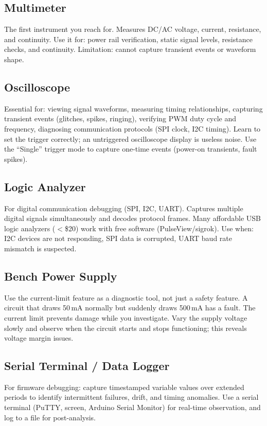 \documentclass[11pt,letterpaper,twoside,openany]{book}
\begin{document}
\subsection{Multimeter}
The first instrument you reach for. Measures DC/AC voltage, current, resistance, and continuity. Use it for: power rail verification, static signal levels, resistance checks, and continuity. Limitation: cannot capture transient events or waveform shape.

\subsection{Oscilloscope}
Essential for: viewing signal waveforms, measuring timing relationships, capturing transient events (glitches, spikes, ringing), verifying PWM duty cycle and frequency, diagnosing communication protocols (SPI clock, I2C timing). Learn to set the trigger correctly; an untriggered oscilloscope display is useless noise. Use the ``Single'' trigger mode to capture one-time events (power-on transients, fault spikes).

\subsection{Logic Analyzer}
For digital communication debugging (SPI, I2C, UART). Captures multiple digital signals simultaneously and decodes protocol frames. Many affordable USB logic analyzers ($<$\$20) work with free software (PulseView/sigrok). Use when: I2C devices are not responding, SPI data is corrupted, UART baud rate mismatch is suspected.

\subsection{Bench Power Supply}
Use the current-limit feature as a diagnostic tool, not just a safety feature. A circuit that draws 50\,mA normally but suddenly draws 500\,mA has a fault. The current limit prevents damage while you investigate. Vary the supply voltage slowly and observe when the circuit starts and stops functioning; this reveals voltage margin issues.

\subsection{Serial Terminal / Data Logger}
For firmware debugging: capture timestamped variable values over extended periods to identify intermittent failures, drift, and timing anomalies. Use a serial terminal (PuTTY, screen, Arduino Serial Monitor) for real-time observation, and log to a file for post-analysis.
\end{document}
